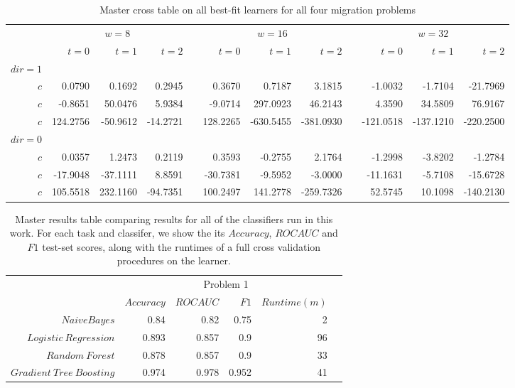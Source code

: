 \documentclass{article}%
\newcommand{\ra}[1]{\renewcommand{\arraystretch}{#1}}
\theoremstyle{definition}
\begin{document}
\begin{landscape}%
	\begin{table*}\centering
		\ra{1.3}
		\begin{tabular}{@{}rrrrcrrrcrrr@{}} \toprule
			&  \multicolumn{3}{c}{$w = 8$} &  \phantom{abc} & \multicolumn{3}{c}{$w = 16$} & \phantom{abc} & \multicolumn{3}{c}{$w = 32$}\\
			\cmidrule{2-4} \cmidrule{6-8} \cmidrule{10-12} 
			& $t=0$ & $t=1$ & $t=2$ && $t=0$ & $t=1$ & $t=2$ && $t=0$ & $t=1$ & $t=2$\\ \midrule
			$dir=1$\\
			$c$ & 0.0790 & 0.1692 & 0.2945 && 0.3670 & 0.7187 & 3.1815 && -1.0032 & -1.7104 & -21.7969\\
			$c$ & -0.8651& 50.0476& 5.9384 && -9.0714& 297.0923& 46.2143&& 4.3590& 34.5809& 76.9167\\
			$c$ & 124.2756& -50.9612&-14.2721&& 128.2265& -630.5455& -381.0930&& -121.0518& -137.1210& -220.2500\\
			$dir=0$\\
			$c$ & 0.0357& 1.2473& 0.2119&& 0.3593& -0.2755& 2.1764&& -1.2998& -3.8202& -1.2784\\
			$c$ & -17.9048& -37.1111& 8.8591&& -30.7381& -9.5952& -3.0000&& -11.1631& -5.7108& -15.6728\\
			$c$ & 105.5518& 232.1160& -94.7351&& 100.2497& 141.2778& -259.7326&& 52.5745& 10.1098& -140.2130\\
			\bottomrule
		\end{tabular}
		\caption{Master cross table on all best-fit learners for all four migration problems}
	\end{table*}
	
	
\end{landscape}



\bigskip


	\begin{table*}\centering
		\caption{Master results table comparing results for all of the classifiers run in this work.
			For each task and classifer, we show the its $Accuracy$, $ROC AUC$ and $F1$ test-set scores, along with the runtimes of a full cross validation procedures on the learner.}\label{tab:master_table_results}
		\ra{1.3}
		\begin{tabular}{@{}rrrrrc@{}} \toprule
			&  \multicolumn{4}{c}{Problem 1} \\
			\cmidrule{2-5} 
			& $Accuracy$ & $ROC AUC$ & $F1$ & $Runtime  (m)$ \\ \midrule
			$Naive Bayes$               & 0.84  & 0.82  & 0.75  & 2  \\
			$Logistic \ Regression$     & 0.893 & 0.857 & 0.9   & 96\\
			$Random \ Forest$            & 0.878 & 0.857 & 0.9  & 33 \\
			$Gradient \ Tree \ Boosting$ & 0.974 & 0.978 & 0.952 & 41  \\
			
			\bottomrule
		\end{tabular}
	\end{table*}
\end{document}
